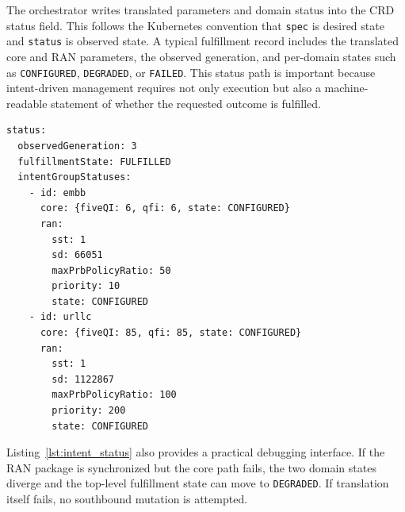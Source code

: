 The orchestrator writes translated parameters and domain status into the CRD status field. This follows the Kubernetes convention that \texttt{spec} is desired state and \texttt{status} is observed state. A typical fulfillment record includes the translated core and RAN parameters, the observed generation, and per-domain states such as \texttt{CONFIGURED}, \texttt{DEGRADED}, or \texttt{FAILED}. This status path is important because intent-driven management requires not only execution but also a machine-readable statement of whether the requested outcome is fulfilled.

\begin{lstlisting}[caption={Representative intent status after translation and domain observation}, label={lst:intent_status}]
status:
  observedGeneration: 3
  fulfillmentState: FULFILLED
  intentGroupStatuses:
    - id: embb
      core: {fiveQI: 6, qfi: 6, state: CONFIGURED}
      ran:
        sst: 1
        sd: 66051
        maxPrbPolicyRatio: 50
        priority: 10
        state: CONFIGURED
    - id: urllc
      core: {fiveQI: 85, qfi: 85, state: CONFIGURED}
      ran:
        sst: 1
        sd: 1122867
        maxPrbPolicyRatio: 100
        priority: 200
        state: CONFIGURED
\end{lstlisting}

Listing~\ref{lst:intent_status} also provides a practical debugging interface. If the RAN package is synchronized but the core path fails, the two domain states diverge and the top-level fulfillment state can move to \texttt{DEGRADED}. If translation itself fails, no southbound mutation is attempted.
